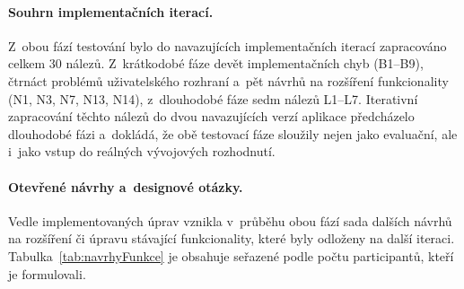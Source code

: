 \paragraph{Souhrn implementačních iterací.}
Z~obou fází testování bylo do navazujících implementačních iterací zapracováno celkem 30 nálezů.
Z~krátkodobé fáze devět implementačních chyb (B1--B9), čtrnáct problémů uživatelského rozhraní a~pět návrhů na rozšíření funkcionality (N1, N3, N7, N13, N14), z~dlouhodobé fáze sedm nálezů L1--L7.
Iterativní zapracování těchto nálezů do dvou navazujících verzí aplikace předcházelo dlouhodobé fázi a~dokládá, že obě testovací fáze sloužily nejen jako evaluační, ale i~jako vstup do reálných vývojových rozhodnutí.

\paragraph{Otevřené návrhy a~designové otázky.}
Vedle implementovaných úprav vznikla v~průběhu obou fází sada dalších návrhů na rozšíření či úpravu stávající funkcionality, které byly odloženy na další iteraci.
Tabulka~\ref{tab:navrhyFunkce} je obsahuje seřazené podle počtu participantů, kteří je formulovali.


